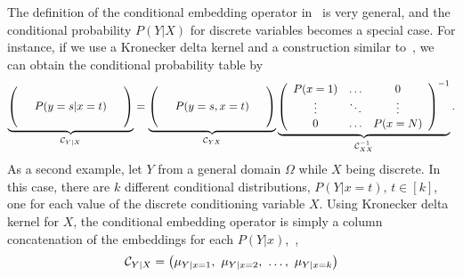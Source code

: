 \documentclass[11pt]{article}
\begin{document}
The definition of the conditional embedding operator in~ is very general, and the conditional probability $P(Y|X)$ for discrete variables becomes a special case. For instance, if we use a Kronecker delta kernel and a construction similar to~, we can obtain the conditional probability table by
\begin{align}
    \underbrace{\left(
        \begin{array}{ccc}
             &  &  \cr
            &  P(y=s|x=t) & \cr
            & &
        \end{array}
    \right)}_{\mathcal{C}_{Y|X}}
    =
    \underbrace{
    \left(
        \begin{array}{ccc}
            & & \cr
            & P(y=s, x=t) & \cr
            & &
        \end{array}
    \right)}_{\mathcal{C}_{YX}}
    \underbrace{
    \left(
        \begin{array}{ccc}
            P(x=1) & \ldots & 0 \cr
            \vdots &  \ddots & \vdots \cr
            0 & \ldots & P(x=N)
        \end{array}
    \right)^{\Large -1}}_{\mathcal{C}_{XX}^{-1}}. \label{eq:conditionalprobabilitytable}
\end{align}
As a second example, let $Y$ from a general domain $\Omega$ while $X$ being discrete. In this case, there are $k$ different conditional distributions, $P(Y|x=t),\,t\in[k]$, one for each value of the discrete conditioning variable $X$. Using Kronecker delta kernel for $X$, the conditional embedding operator is simply a column concatenation of the embeddings for each $P(Y|x)$,~\ie,
\begin{align}
  \mathcal{C}_{Y|X} = \left(\mu_{Y|x=1},\ \mu_{Y|x=2},\ \ldots,\ \mu_{Y|x=k}\right)
\end{align}
\end{document}
